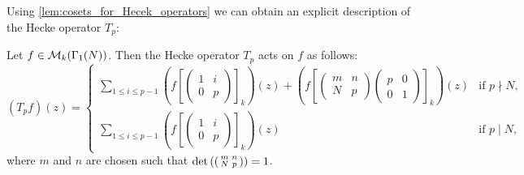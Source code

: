       Using \cref{lem:cosets_for_Hecek_operators} we can obtain an explicit description of the Hecke operator $T_{p}$:

      \begin{proposition}\label{prop:explicit_description_of_Hecke_operators_modular}
        Let $f \in \mathcal{M}_{k}(\Gamma_{1}(N))$. Then the Hecke operator $T_{p}$ acts on $f$ as follows:
        \[
          (T_{p}f)(z) = \begin{cases} \displaystyle\sum_{1 \le i \le p-1}\left(f\left[\begin{pmatrix} 1 & i \\ 0 & p \end{pmatrix}\right]_{k}\right)(z)+\left(f\left[\begin{pmatrix} m & n \\ N & p \end{pmatrix}\begin{pmatrix} p & 0 \\ 0 & 1 \end{pmatrix}\right]_{k}\right)(z) & \text{if $p \nmid N$}, \\ \displaystyle\sum_{1 \le i \le p-1}\left(f\left[\begin{pmatrix} 1 & i \\ 0 & p \end{pmatrix}\right]_{k}\right)(z) & \text{if $p \mid N$}, \end{cases}
        \]
        where $m$ and $n$ are chosen such that $\det\left(\begin{psmallmatrix} m & n \\ N & p \end{psmallmatrix}\right) = 1$.
      \end{proposition}
